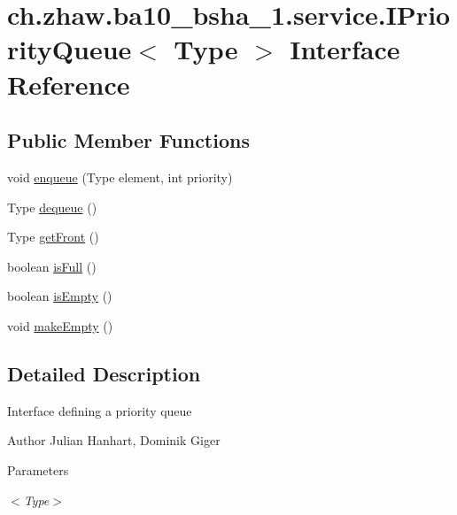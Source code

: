 \hypertarget{interfacech_1_1zhaw_1_1ba10__bsha__1_1_1service_1_1IPriorityQueue_3_01Type_01_4}{
\section{ch.zhaw.ba10\_\-bsha\_\-1.service.IPriorityQueue$<$ Type $>$ Interface Reference}
\label{interfacech_1_1zhaw_1_1ba10__bsha__1_1_1service_1_1IPriorityQueue_3_01Type_01_4}
}
\subsection*{Public Member Functions}
\begin{DoxyCompactItemize}
\item 
void \hyperlink{interfacech_1_1zhaw_1_1ba10__bsha__1_1_1service_1_1IPriorityQueue_3_01Type_01_4_aa9cdd52f39b33c253ec7bad245bd5023}{enqueue} (Type element, int priority)
\item 
Type \hyperlink{interfacech_1_1zhaw_1_1ba10__bsha__1_1_1service_1_1IPriorityQueue_3_01Type_01_4_ab7f77589afa931b05e90eefe9d78c19b}{dequeue} ()
\item 
Type \hyperlink{interfacech_1_1zhaw_1_1ba10__bsha__1_1_1service_1_1IPriorityQueue_3_01Type_01_4_aea8391905080302c5b40dd2241cd5f8e}{getFront} ()
\item 
boolean \hyperlink{interfacech_1_1zhaw_1_1ba10__bsha__1_1_1service_1_1IPriorityQueue_3_01Type_01_4_aa4d7034ec67137e3df7ff738bcafafe0}{isFull} ()
\item 
boolean \hyperlink{interfacech_1_1zhaw_1_1ba10__bsha__1_1_1service_1_1IPriorityQueue_3_01Type_01_4_a648bb0e1ba43092a431d748a49d2c7ae}{isEmpty} ()
\item 
void \hyperlink{interfacech_1_1zhaw_1_1ba10__bsha__1_1_1service_1_1IPriorityQueue_3_01Type_01_4_ae7df246cb037e0976dfbc24c720d273a}{makeEmpty} ()
\end{DoxyCompactItemize}


\subsection{Detailed Description}
Interface defining a priority queue

\begin{DoxyAuthor}{Author}
Julian Hanhart, Dominik Giger 
\end{DoxyAuthor}

\begin{DoxyParams}{Parameters}
\item[{\em $<$Type$>$}]\end{DoxyParams}


